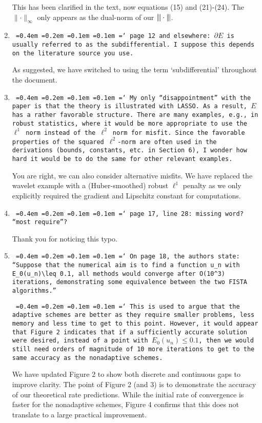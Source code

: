 \documentclass[12pt]{article}
\newcommand*\justify{%
	\fontdimen2\font=0.4em%
	\fontdimen3\font=0.2em%
	\fontdimen4\font=0.1em%
	\fontdimen7\font=0.1em%
	\hyphenchar\font=`\-%
}
\newcommand{\review}[1]{\texttt{\justify{#1}}}
\begin{document}
\begin{enumerate}
	This has been clarified in the text, now equations (15) and (21)-(24). The $\lVert\cdot\rVert_\infty$ only appears as the dual-norm of our ${\vert\kern-0.25ex\vert\kern-0.25ex\vert \cdot \vert\kern-0.25ex\vert\kern-0.25ex\vert}$.
	
	\item \review{page 12 and elsewhere: $\partial E$ is usually referred to as the subdifferential. I suppose this depends on the literature source you use.}
	
	As suggested, we have switched to using the term `subdifferential' throughout the document.
	
	\item \review{My only ``disappointment'' with the paper is that the theory is illustrated with LASSO. As a result, $E$ has a rather favorable structure. There are many examples, e.g., in robust statistics, where it would be more appropriate to use the $\ell^1$ norm instead of the $\ell^2$ norm for misfit. Since the favorable properties of the squared $\ell^2$-norm are often used in the derivations (bounds, constants, etc. in Section 6), I wonder how hard it would be to do the same for other relevant examples.}
	
	You are right, we can also consider alternative misfits. We have replaced the wavelet example with a (Huber-smoothed) robust $\ell^1$ penalty as we only explicitly required the gradient and Lipschitz constant for computations.
	
	\item \review{page 17, line 28: missing word? ``most require''?}
	
	Thank you for noticing this typo.
	
	\item \review{On page 18, the authors state: ``Suppose that the numerical aim is to find a function $u_n$ with $E_0(u_n)\leq 0.1$, all methods would converge after $O(10^3)$ iterations, demonstrating some equivalence between the two FISTA algorithms.''}
	
	\review{This is used to argue that the adaptive schemes are better as they require smaller problems, less memory and less time to get to this point. However, it would appear that Figure 2 indicates that if a sufficiently accurate solution were desired, instead of a point with $E_0(u_n)\leq 0.1$, then we would still need orders of magnitude of 10 more iterations to get to the same accuracy as the nonadaptive schemes.}
	
	We have updated Figure 2 to show both discrete and continuous gaps to improve clarity. The point of Figure 2 (and 3) is to demonstrate the accuracy of our theoretical rate predictions. While the initial rate of convergence is faster for the nonadaptive schemes, Figure 4 confirms that this does not translate to a large practical improvement.
\end{enumerate}
\end{document}
